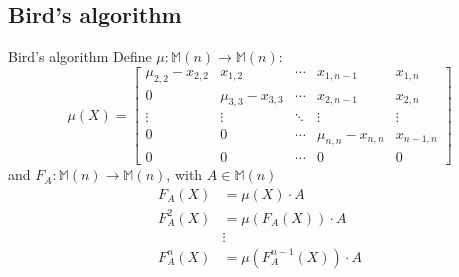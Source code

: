 \documentclass{beamer}
\begin{document}
\subsection{Bird's algorithm}

\begin{frame}{Bird's algorithm}
    Define $\mu : \mathbb{M}(n) \to \mathbb{M}(n)$:
    \[
        \mu(X) =
        \begin{bmatrix}{}
            \mu_{2,2} - x_{2,2} & x_{1,2}             & \cdots & x_{1,n-1}           & x_{1,n} \\
            0                   & \mu_{3,3} - x_{3,3} & \cdots & x_{2,n-1}           & x_{2,n} \\
            \vdots              & \vdots              & \ddots & \vdots              & \vdots \\
            0                   & 0                   & \cdots & \mu_{n,n} - x_{n,n} & x_{n-1,n} \\
            0                   & 0                   & \cdots & 0                   & 0
        \end{bmatrix}
    \]
    and $F_A : \mathbb{M}(n) \to \mathbb{M}(n)$,
    with $A \in \mathbb{M}(n)$
    \begin{align*}{}
        F_A(X)    & = \mu(X)\cdot A \\
        F_A^2(X)  & = \mu(F_A(X)) \cdot A \\
                  & \vdots \\
        F_A^n(X)  & = \mu(F_A^{n-1}(X)) \cdot A \\
    \end{align*}

\end{frame}
\end{document}
